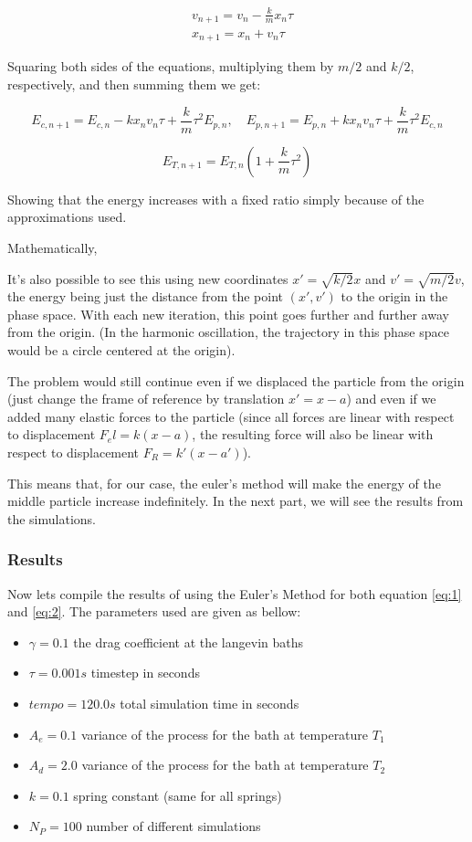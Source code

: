 \begin{equation*}
\begin{aligned}
&v_{n+1} = v_n -\frac{k}{m}x_n \tau\\
&x_{n+1} = x_n + v_n \tau
\end{aligned}
\end{equation*}

Squaring both sides of the equations, multiplying them by $m/2$ and $k/2$, respectively, and then summing them we get:

$$
E_{c,n+1} = E_{c,n} -k x_n v_n \tau + \frac{k}{m} \tau^2 E_{p,n}, \quad
E_{p,n+1} = E_{p,n} + k x_n v_n \tau + \frac{k}{m} \tau^2 E_{c,n}
$$

\begin{equation*}
E_{T, n+1} = E_{T,n}\left(1 + \frac{k}{m}\tau^2\right)
\end{equation*}

Showing that the energy increases with a fixed ratio simply because of the approximations used.

Mathematically, 

It's also possible to see this using new coordinates $x' = \sqrt{k/2}x$ and $v' = \sqrt{m/2}v$, the energy being just the distance from the point $(x',v')$ to the origin in the phase space. With each new iteration, this point goes further and further away from the origin.
(In the harmonic oscillation, the trajectory in this phase space would be a circle centered at the origin).

The problem would still continue even if we displaced the particle from the origin (just change the frame of reference by translation $x' = x-a$) and even if we added many elastic forces to the particle (since all forces are linear with respect to displacement $F_el = k(x-a)$, the resulting force will also be linear with respect to displacement $F_R = k'(x-a')$).

This means that, for our case, the euler's method will make the energy of the middle particle increase indefinitely. In the next part, we will see the results from the simulations.

\subsubsection{Results}
Now lets compile the results of using the Euler's Method for both equation \ref{eq:1} and \ref{eq:2}. The parameters used are given as bellow:

\begin{itemize}
	\item $\gamma = 0.1$ the drag coefficient at the langevin baths
	\item $\tau = 0.001 s$ timestep in seconds
	\item $tempo = 120.0 s$ total simulation time in seconds
	\item $A_e = 0.1$ variance of the process for the bath at temperature $T_1$
	\item $A_d = 2.0$ variance of the process for the bath at temperature $T_2$
	\item $k=0.1$ spring constant (same for all springs)
	\item $N_P = 100$ number of different simulations
\end{itemize}


